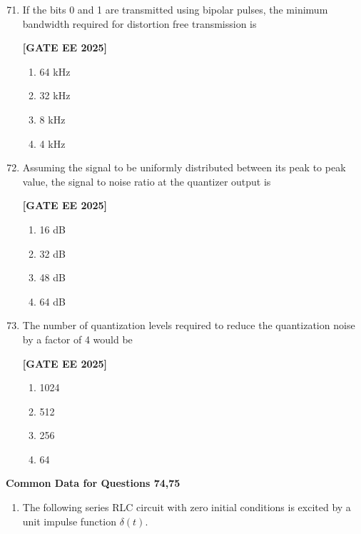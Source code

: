\documentclass[12pt]{article}
\begin{document}
\begin{enumerate}[leftmargin=*, label=\textbf{Q.\arabic*:}]
\setcounter{enumi}{70}

\item If the bits 0 and 1 are transmitted using bipolar pulses, the minimum bandwidth required for distortion free transmission is
 
\noindent \textbf{[GATE EE 2025]}
\begin{multicols}{4}
\begin{enumerate}
  \item 64 kHz
  \item 32 kHz
  \item 8 kHz
  \item 4 kHz
\end{enumerate}
\end{multicols}

\item Assuming the signal to be uniformly distributed between its peak to peak value, the signal to noise ratio at the quantizer output is
 
\noindent \textbf{[GATE EE 2025]}
\begin{multicols}{4}
\begin{enumerate}
  \item 16 dB
  \item 32 dB
  \item 48 dB
  \item 64 dB
\end{enumerate}
\end{multicols}

\item The number of quantization levels required to reduce the quantization noise by a factor of 4 would be
 
\noindent \textbf{[GATE EE 2025]}
\begin{multicols}{4}
\begin{enumerate}
  \item 1024
  \item 512
  \item 256
  \item 64
\end{enumerate}
\end{multicols}

\end{enumerate}


 \large \textbf {Common Data for Questions 74,75}


\begin{enumerate}
\item The following series RLC circuit with zero initial conditions is excited by a unit impulse function $\delta(t)$.
\end{enumerate}
 
\end{document}

